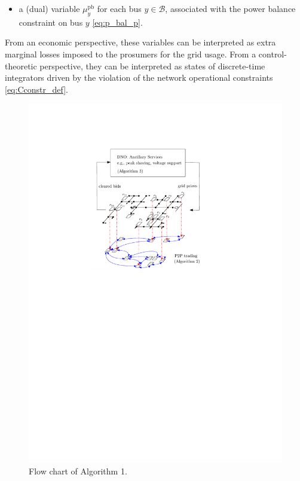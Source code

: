 \documentclass{IEEEtran}  %
\newcommand{\mc}{\mathcal}
\newcommand{\0}{\mathbf{0}}
\newcommand{\1}{\mathbf{1}}
\begin{document}
{\begin{itemize}
\item a (dual) variable $\mu_{y}^{\text{pb}}$ for each bus $y \in \mc B$, associated with the power balance constraint on bus $y$ \eqref{eq:p_bal_p}.
\end{itemize}
From an economic perspective, these variables can be interpreted as extra marginal losses imposed to the prosumers for the grid usage. From a control-theoretic perspective, they can be interpreted as states of discrete-time integrators driven by the violation of the network operational constraints \eqref{eq:Cconstr_def}.
}
%
\begin{figure}[t]
\centering
\includegraphics[width=.4\textwidth]{figures/flowChart_v1}
\caption{Flow chart of Algorithm 1.}
\label{fig:IFC}
\end{figure}
%
\end{document}
